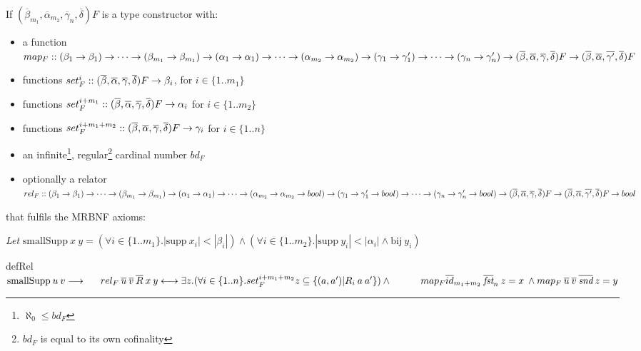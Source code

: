\begin{definition}[\ac{MRBNF}]
If $(\overline{\beta}_{m_1}, \overline{\alpha}_{m_2}, \overline{\gamma}_n, \overline{\delta}) F$ is a type constructor with:
\begin{itemize}
\item{a function $map_F :: (\beta_1 \to \beta_1) \to \dots \to (\beta_{m_1} \to \beta_{m_1}) \to (\alpha_1 \to \alpha_1) \to \dots \to (\alpha_{m_2} \to \alpha_{m_2}) \to (\gamma_1 \to \gamma'_1) \to \dots \to (\gamma_n \to \gamma'_n) \to (\overline{\beta}, \overline{\alpha}, \overline{\gamma}, \overline{\delta}) F \to (\overline{\beta}, \overline{\alpha}, \overline{\gamma'}, \overline{\delta}) F$}
\item{functions $set_F^i :: (\overline{\beta}, \overline{\alpha}, \overline{\gamma}, \overline{\delta}) F \to \beta_i$, for $i \in \{1 .. m_1\}$}
\item{functions $set_F^{i+m_1} :: (\overline{\beta}, \overline{\alpha}, \overline{\gamma}, \overline{\delta}) F \to \alpha_i$ for $i \in \{1 .. m_2\}$}
\item{functions $set_F^{i+m_1+m_2} :: (\overline{\beta}, \overline{\alpha}, \overline{\gamma}, \overline{\delta}) F \to \gamma_i$ for $i \in \{1 .. n\}$}
\item{an infinite\footnote{$\aleph_0 \le bd_F$}, regular\footnote{$bd_F$ is equal to its own cofinality\label{ftn:regular}} cardinal number $bd_F$}
\item{optionally a relator $rel_F :: (\beta_1 \to \beta_1) \to \dots \to (\beta_{m_1} \to \beta_{m_1}) \to (\alpha_1 \to \alpha_1) \to \dots \to (\alpha_{m_2} \to \alpha_{m_2} \to bool) \to (\gamma_1 \to \gamma'_1 \to bool) \to \dots \to (\gamma_n \to \gamma'_n \to bool) \to (\overline{\beta}, \overline{\alpha}, \overline{\gamma}, \overline{\delta}) F \to (\overline{\beta}, \overline{\alpha}, \overline{\gamma'}, \overline{\delta}) F \to bool$}
\end{itemize}


that fulfils the \ac{MRBNF} axioms:
\vspace{1em}

\textit{Let} $\text{smallSupp} \: x \: y = (\forall i \in \{1..m_1\}. |\text{supp} \: x_i| < |\beta_i|) \wedge (\forall i \in \{1..m_2\}. |\text{supp} \: y_i| < |\alpha_i| \wedge \text{bij} \: y_i)$

\newcommand{\mapF}[3]{map_F \: \overline{#1} \: \overline{#2} \: \overline{#3}}
\newcommand{\relF}[3]{rel_F \: \overline{#1} \: \overline{#2} \: \overline{#3}}
\newcommand{\smallSupp}[2]{\text{smallSupp} \: #1 \: #2}

\begin{axiom}{defRel}\label{ax:def_rel}
$\smallSupp{u}{v} \longrightarrow \\
\ms \relF{u}{v}{R} \: x \: y \longleftrightarrow \exists z. (\forall i \in \{1..n\}. set_F^{i+m_1+m_2} z \subseteq \{(a, a') | R_i \: a \: a' \}) \wedge \\
\ms \ms map_F \overline{id}_{m_1+m_2} \: \overline{\textit{fst}}_n \: z = x \: \wedge \mapF{u}{v}{\textit{snd}} \: z = y
$
\end{axiom}


\end{definition}
